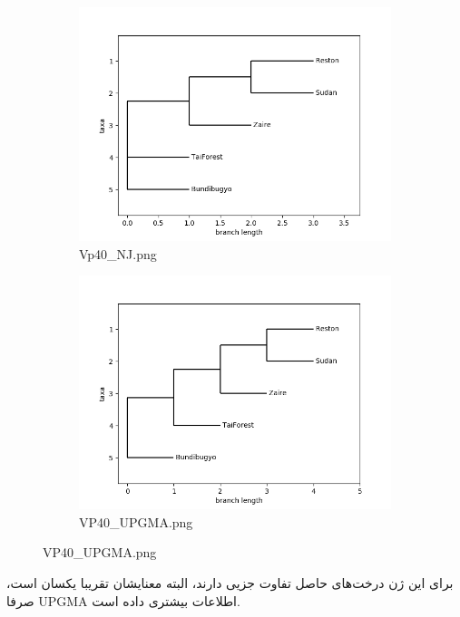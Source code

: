 \documentclass[11pt]{article}
\begin{document}
\newline
\begin{figure}[H]
  \centering
  \begin{subfigure}[b]{0.4\linewidth}
    \includegraphics[width=\linewidth]{../Data/Trees/VP40_NJ.png}
    \caption{Vp40\_NJ.png}
  \end{subfigure}
  \begin{subfigure}[b]{0.4\linewidth}
    \includegraphics[width=\linewidth]{../Data/Trees/VP40_UPGMA.png}
    \caption{VP40\_UPGMA.png}
  \end{subfigure}
\end{figure}
برای این ژن درخت‌های حاصل تفاوت جزیی دارند، البته معنایشان تقریبا یکسان است، صرفا UPGMA اطلاعات بیشتری داده است.
\end{document}
